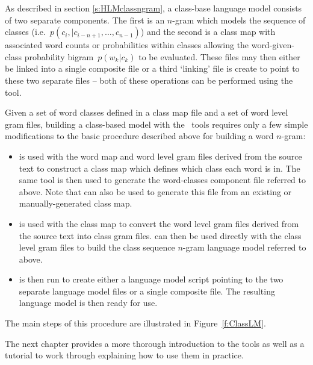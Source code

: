 

As described in section \ref{s:HLMclassngram}, a class-base language
model consists of two separate components.  The first is an $n$-gram
which models the sequence of classes (i.e.\ $p(c_i, | c_{i-n+1},
\ldots, c_{n-1})$) and the second is a class map with associated word
counts or probabilities within classes allowing the word-given-class
probability bigram\ $p(w_k|c_k)$ to be evaluated.  These files may
then either be linked into a single composite file or a third `linking'
file is create to point to these two separate files -- both of these
operations can be performed using the  tool.

Given a set of word classes defined in a class map file and a set of
word level gram files, building a class-based model with the \HTK\
tools requires only a few simple modifications to the basic procedure
described above for building a word $n$-gram:
\begin{itemize}
\item {} is used with the word map and word level gram
  files derived from the source text to construct a class map which
  defines which class each word is in.  The same tool is then used to
  generate the word-classes component file referred to above.
  Note that  can also be used to generate this file
  from an existing or manually-generated class map.
     
\item {} is used with the class map to convert the word level 
  gram files derived from the source text into class gram files.  
  \htool{LBuild} can then be used directly with the class level gram
  files to build the class sequence $n$-gram language model
  referred to above.

\item {} is then run to create either a language model
  script pointing to the two separate language model files or a single
  composite file.  The resulting language model
  is then ready for use.
\end{itemize}
The main steps of this procedure are illustrated in
Figure~\ref{f:ClassLM}.

The next chapter provides a more thorough introduction to the tools as
well as a tutorial to work through explaining how to use them in
practice.

